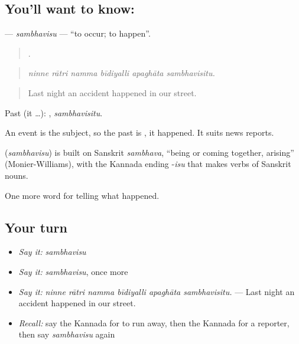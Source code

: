 \subsection*{You'll want to know: }
\textbf{} — \emph{sambhavisu} — \textquotedblleft{}to occur; to happen\textquotedblright{}.

\begin{quote}
     .
\end{quote}

\begin{quote}
\emph{ninne rātri namma bīdiyalli apaghāta sambhavisitu.}
\end{quote}

\begin{quote}
Last night an accident happened in our street.
\end{quote}

Past (it …): , \emph{sambhavisitu}.

An event is the subject, so the past is , it happened. It suits news reports.

\begin{cousinweb}
\textbf{} (\emph{sambhavisu}) is built on Sanskrit \emph{sambhava}, \textquotedblleft{}being or coming together, arising\textquotedblright{} (Monier-Williams), with the Kannada ending -\emph{isu} that makes verbs of Sanskrit nouns.
\end{cousinweb}

\begin{grammarlens}[title={What you've built}]
One more word for telling what happened.
\end{grammarlens}

\subsection*{Your turn}
\begin{itemize}
\raggedright
  \item \emph{Say it:} \emph{sambhavisu}
  \item \emph{Say it:} \emph{sambhavisu}, once more
  \item \emph{Say it:} \emph{ninne rātri namma bīdiyalli apaghāta sambhavisitu.} — Last night an accident happened in our street.
  \item \emph{Recall:} say the Kannada for to run away, then the Kannada for a reporter, then say \emph{sambhavisu} again
\end{itemize}


